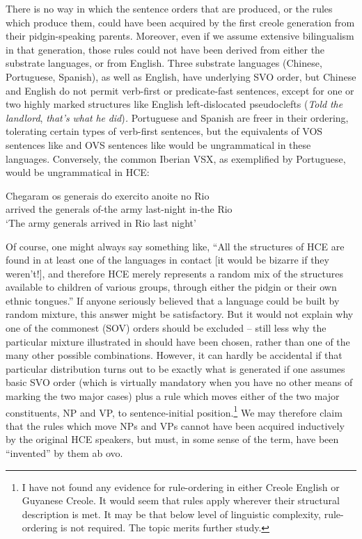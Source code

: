 There is no way in which the sentence orders that are produced, or the rules which produce them, could have been acquired by the first creole generation from their pidgin-speaking parents. Moreover, even if we assume extensive bilingualism in that generation, those rules could not have been derived from either the substrate languages, or from English. Three substrate languages (Chinese, Portuguese, Spanish), as well as English, have underlying SVO order, but Chinese and English do not permit verb-first or predicate-fast sentences, except for one or two highly marked structures like English left-dislocated pseudo\-clefts (\textit{Told} \textit{the} \textit{landlord}, \textit{that's} \textit{what} \textit{he} \textit{did})\textit{.} Portuguese and Spanish are freer in their ordering, tolerating certain types of verb-first sen\-tences, but the equivalents of VOS sentences like  and OVS sen\-tences like  would be ungrammatical in these languages. Conversely, the common Iberian VSX, as exemplified by Portuguese, would be ungrammatical in HCE:

\ea\label{ex:29}
 \gll Chegaram os generais do exercito anoite no Rio\\ 
	  arrived the generals of-the army last-night in-the Rio\\
 \glt `The army generals arrived in Rio last night'
\glt 
\z

Of course, one might always say something like, ``All the struc\-tures of HCE are found in at least one of the languages in contact [it would be bizarre if they weren't!], and therefore HCE merely repre\-sents a random mix of the structures available to children of various groups, through either the pidgin or their own ethnic tongues.'' If anyone seriously believed that a language could be built by random mixture, this answer might be satisfactory. But it would not explain why one of the commonest (SOV) orders should be excluded -- still less why the particular mixture illustrated in  should have been chosen, rather than one of the many other possible combinations. However, it can hardly be accidental if that particular distribution turns out to be exactly what is generated if one assumes basic SVO order (which is virtually mandatory when you have no other means of mark\-ing the two major cases) plus a rule which moves either of the two
major constituents, NP and VP, to sentence-initial position.\footnote{I have not found any evidence for rule-ordering in either Creole English or Guyanese Creole. It would seem that rules apply wherever their structural description is met. It may be that below level of linguistic complexity, rule-ordering is not required. The topic merits further study.} We may therefore claim that the rules which move NPs and VPs cannot have been acquired inductively by the original HCE speakers, but must, in some sense of the term, have been ``invented'' by them ab ovo.

